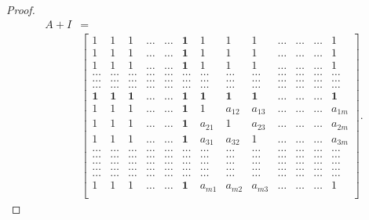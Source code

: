 \documentclass[12pt]{article}
\begin{document}
\begin{proof}
		\begin{equation}
			\label{Eq1}
			\begin{split}
				A+I&=
				\\
				&
				\left[
				\begin{array}{cccccccccccccccccc}
					1 & 1 & 1& \ldots &\dots & \textbf{1}&1 & 1 & 1& \ldots&\ldots &\ldots& 1\\
					1 & 1 & 1& \ldots &\dots &\textbf{1}&1 & 1 & 1& \ldots &\ldots&\ldots& 1\\
					1& 1 & 1 &\ldots&\dots& \textbf{1}&1 & 1 & 1& \ldots &\ldots&\ldots& 1\\
					\ldots& \ldots &\ldots &\ldots&\ldots& \ldots &\ldots &\ldots&\ldots&\ldots&\ldots&\ldots&\ldots\\
					\ldots& \ldots &\ldots &\ldots&\ldots& \ldots &\ldots &\ldots&\ldots&\ldots&\ldots&\ldots&\ldots\\
					\ldots& \ldots &\ldots &\ldots&\ldots& \ldots &\ldots &\ldots&\ldots&\ldots&\ldots&\ldots&\ldots\\
					\textbf{1}& \textbf{1} &\textbf{1}&\ldots &\ldots& \textbf{1} &\textbf{1} & \textbf{1} & \textbf{1}& \ldots &\ldots&\ldots& \textbf{1}\\
					1 & 1 &1  & \ldots&\ldots&\textbf{1} & 1 & a_{12} &a_{13}& \ldots&\ldots&\ldots&a_{1m}\\
					1 & 1 &1 & \ldots&\ldots & \textbf{1}& a_{21} & 1 &a_{23}& \ldots&\ldots&\ldots&a_{2m}\\
					1& 1 & 1 &\ldots&\dots& \textbf{1}&a_{31} & a_{32} & 1& \ldots &\ldots&\ldots& a_{3m}\\
					\ldots& \ldots &\ldots &\ldots&\ldots& \ldots &\ldots &\ldots&\ldots& \ldots&\ldots&\ldots&\ldots \\
					\ldots& \ldots &\ldots &\ldots&\ldots& \ldots &\ldots &\ldots&\ldots& \ldots &\ldots&\ldots&\ldots\\
					\ldots& \ldots &\ldots &\ldots&\ldots& \ldots &\ldots &\ldots&\ldots& \ldots &\ldots&\ldots&\ldots\\
					\ldots& \ldots &\ldots &\ldots&\ldots& \ldots &\ldots &\ldots&\ldots& \ldots &\ldots&\ldots&\ldots\\
					\ldots& \ldots &\ldots &\ldots&\ldots& \ldots &\ldots &\ldots&\ldots&\ldots&\ldots&\ldots&\ldots\\
					1 & 1 & 1 &  \ldots& \dots&\textbf{1}& a_{m1} & a_{m2} &  a_{m3}&\ldots&\ldots&\ldots& 1\\
				\end{array}
				\right].
			\end{split}
		\end{equation}
		

\end{proof}
\end{document}
